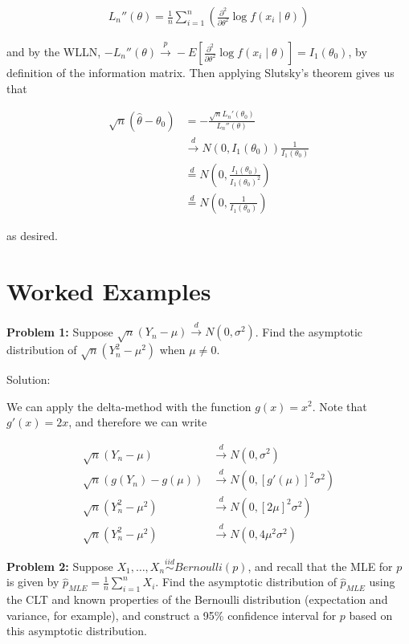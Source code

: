 \documentclass[
  letterpaper,
  DIV=11,
  numbers=noendperiod]{scrreprt}
\begin{document}
\begin{align*}
    L_n''(\theta) = \frac{1}{n} \sum_{i = 1}^n \left( \frac{\partial^2}{\partial \theta^2} \log f(x_i \mid \theta) \right)
\end{align*}

and by the WLLN,
\(-L_n''(\theta) \overset{p}{\to} -E\left[ \frac{\partial^2}{\partial \theta^2} \log f(x_i \mid \theta) \right] = I_1(\theta_0)\),
by definition of the information matrix. Then applying Slutsky's theorem
gives us that

\begin{align*}
    \sqrt{n} (\hat{\theta} - \theta_0) & = - \frac{\sqrt{n} L_n'(\theta_0)}{L_n''(\theta)} \\
    & \overset{d}{\to} N(0, I_1(\theta_0)) \frac{1}{I_1(\theta_0)} \\
    & \overset{d}{=} N\left( 0, \frac{I_1(\theta_0)}{I_1(\theta_0)^2}\right) \\
    & \overset{d}{=} N\left( 0, \frac{1}{I_1(\theta_0)}\right)
\end{align*}

as desired.

\section{Worked Examples}\label{worked-examples-5}

\textbf{Problem 1:} Suppose
\(\sqrt{n}(Y_n - \mu) \overset{d}{\to} N(0, \sigma^2)\). Find the
asymptotic distribution of \(\sqrt{n}(Y_n^2 - \mu^2)\) when
\(\mu \neq 0\).

Solution:

We can apply the delta-method with the function \(g(x) = x^2\). Note
that \(g'(x) = 2x\), and therefore we can write

\begin{align*}
    \sqrt{n}(Y_n - \mu) & \overset{d}{\to} N(0, \sigma^2) \\
    \sqrt{n}(g(Y_n) - g(\mu)) & \overset{d}{\to} N(0, [g'(\mu)]^2\sigma^2) \\
    \sqrt{n}(Y_n^2 - \mu^2) & \overset{d}{\to} N(0, [2\mu]^2\sigma^2) \\
    \sqrt{n}(Y_n^2 - \mu^2) & \overset{d}{\to} N(0, 4 \mu^2\sigma^2)
\end{align*}

\textbf{Problem 2:} Suppose
\(X_1, \dots, X_n \overset{iid}{\sim} Bernoulli(p)\), and recall that
the MLE for \(p\) is given by
\(\hat{p}_{MLE} = \frac{1}{n} \sum_{i = 1}^n X_i\). Find the asymptotic
distribution of \(\hat{p}_{MLE}\) using the CLT and known properties of
the Bernoulli distribution (expectation and variance, for example), and
construct a 95\% confidence interval for \(p\) based on this asymptotic
distribution.
\end{document}
